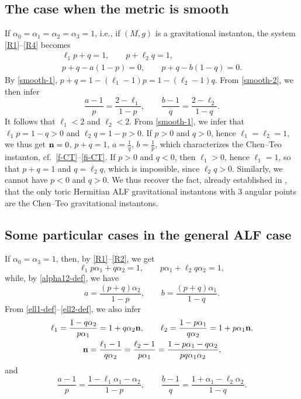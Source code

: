 \documentclass[10pt,a4paper]{amsart}
\numberwithin{equation}{section}
\begin{document}
\subsection{The case when the metric is smooth} \label{ss-smooth} If $\alpha _0 = \alpha _1 = \alpha _2 = \alpha _3 = 1$, i.e., if $(M, g)$ is a gravitational instanton, the system \eqref{R1}--\eqref{R4} becomes
\begin{gather} \ell _1 p + q = 1, \qquad p + \ell _2 q = 1, \label{smooth-1}\\
 p + q - a (1 - p) = 0, \qquad p + q - b (1 - q) = 0. \label{smooth-2}\end{gather}
By \eqref{smooth-1}, $p + q = 1 - (\ell _1 - 1) p = 1 - (\ell _2 - 1) q$. From \eqref{smooth-2}, we then infer
\[\frac{a - 1}{p} = \frac{2 - \ell _1}{1 - p}, \qquad \frac{b - 1}{q} = \frac{2 - \ell _2}{1 - q}. \]
It follows that $\ell _1 < 2$ and $\ell _2 < 2$. From \eqref{smooth-1}, we infer that $\ell _1 p = 1 - q > 0$ and $\ell _2 q = 1 - p > 0$. If $p > 0$ and $q > 0$, hence $\ell _1 = \ell _2 = 1$, we thus get ${\bf n} = 0$, $p + q = 1$, $a = \frac{1}{q}$, $b = \frac{1}{p}$, which characterizes the Chen--Teo instanton, cf.\ \eqref{f-CT}--\eqref{fi-CT}.
If $p > 0$ and $q < 0$, then $\ell _1 > 0$, hence $\ell _1 = 1$, so that $p + q = 1$ and $q = \ell _2 q$, which is impossible, since $\ell _2 q > 0$. Similarly, we cannot have $p < 0$ and $q > 0$. We thus recover the fact, already established in \cite[Section~7]{BG}, that the only toric Hermitian ALF gravitational instantons with 3 angular points are the Chen--Teo gravitational instantons.

\subsection{Some particular cases in the general ALF case} \label{sec:some-part-cases}

 If $\alpha _0 = \alpha _3 = 1$, then, by \eqref{R1}--\eqref{R2}, we get
\[ \ell _1 p \alpha _1 + q \alpha _2 = 1, \qquad p \alpha _1 + \ell _2 q \alpha _2 = 1, \]
while, by \eqref{alpha12-def}, we have
\[ a = \frac{(p + q) \alpha _2}{1 - p}, \qquad b = \frac{(p + q) \alpha _1}{1 - q}. \]
From \eqref{ell1-def}--\eqref{ell2-def}, we also infer
\begin{gather*} \ell _1 = \frac{1 - q \alpha _2}{p \alpha _1} = 1 + q \alpha _2 {\bf n}, \qquad \ell _2 = \frac{1 - p \alpha _1}{q \alpha _2} = 1 + p \alpha _1 {\bf n}, \\
 {\bf n} = \frac{\ell _1 - 1}{q \alpha _2} = \frac{\ell _2 - 1}{p \alpha _1} = \frac{1 - p \alpha _1 - q \alpha _2}{p q \alpha _1 \alpha _2}, \end{gather*}
and\
\[ \frac{a - 1}{p} = \frac{1 - \ell _1 \alpha _1 - \alpha _2}{1 - p}, \qquad \frac{b - 1}{q} = \frac{1 + \alpha _1 - \ell _2 \alpha _2}{1 - q}. \]
\end{document}
